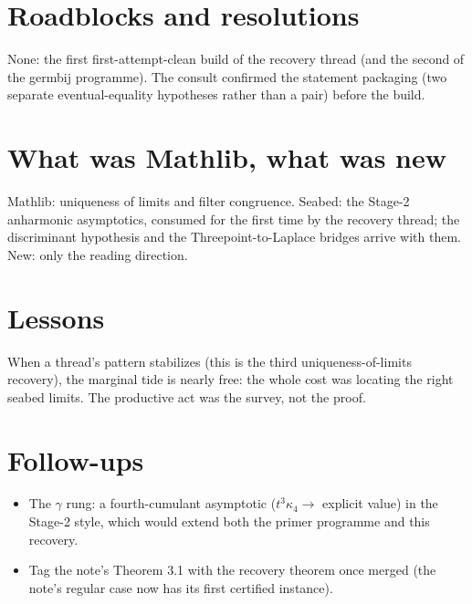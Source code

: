 \documentclass[11pt]{article}
\begin{document}
\section{Roadblocks and resolutions}

None: the first first-attempt-clean build of the recovery thread (and
the second of the germbij programme). The consult confirmed the
statement packaging (two separate eventual-equality hypotheses rather
than a pair) before the build.

\section{What was Mathlib, what was new}

Mathlib: uniqueness of limits and filter congruence. Seabed: the
Stage-2 anharmonic asymptotics, consumed for the first time by the
recovery thread; the discriminant hypothesis and the
Threepoint-to-Laplace bridges arrive with them. New: only the reading
direction.

\section{Lessons}

When a thread's pattern stabilizes (this is the third
uniqueness-of-limits recovery), the marginal tide is nearly free: the
whole cost was locating the right seabed limits. The productive act was
the survey, not the proof.

\section{Follow-ups}

\begin{itemize}
\item The $\gamma$ rung: a fourth-cumulant asymptotic
($t^3 \kappa_4 \to$ explicit value) in the Stage-2 style, which would
extend both the primer programme and this recovery.
\item Tag the note's Theorem 3.1 with the recovery theorem once merged
(the note's regular case now has its first certified instance).
\end{itemize}
\end{document}

